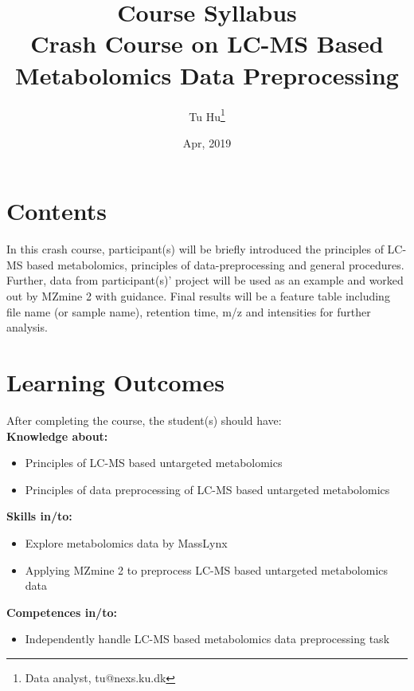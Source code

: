 \documentclass[]{article}
\title{Course Syllabus \\ {\small Crash Course on LC-MS Based Metabolomics Data Preprocessing}}
\author{Tu Hu\footnote{Data analyst, tu@nexs.ku.dk}}
\date{Apr, 2019}
\begin{document}
\maketitle

\section{Contents}
	In this crash course, participant(s) will be briefly introduced the principles of LC-MS based metabolomics, principles of data-preprocessing and general procedures. 
	Further, data from participant(s)' project will be used as an example and worked out by MZmine 2 with guidance. Final results will be a feature table including file name (or sample name), retention time, m/z and intensities for further analysis.
\section{Learning Outcomes}

After completing the course, the student(s) should have:
\\

\textbf{Knowledge about:}
\begin{itemize}
	\item Principles of LC-MS based untargeted metabolomics
	\item Principles of data preprocessing of LC-MS based untargeted metabolomics\\
\end{itemize}


\textbf{Skills in/to:}
\begin{itemize}
	\item Explore metabolomics data by MassLynx
	\item Applying MZmine 2 to preprocess LC-MS based untargeted metabolomics data 

\end{itemize}


\textbf{Competences in/to:}
\begin{itemize}
	\item Independently handle LC-MS based metabolomics data preprocessing task
\end{itemize}

\newpage
\end{document}
